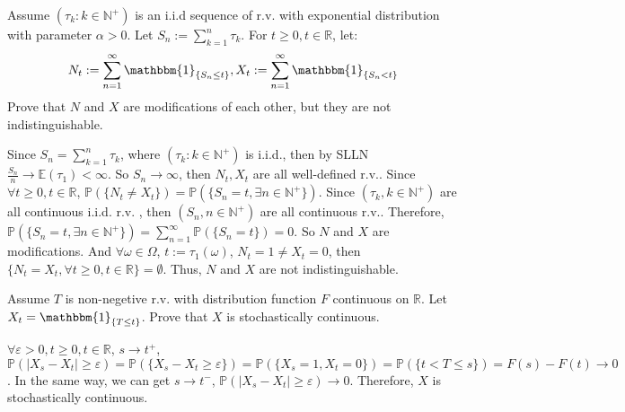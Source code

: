 \documentclass{ctexart}
\begin{document}
\begin{problem}\label{pro:4}
  Assume \((\tau_k:k \in \mathbb{N}^+)\) is an i.i.d sequence of r.v. with exponential distribution with parameter \(\alpha>0\).
  Let \(S_n:=\sum_{k=1}^{n}\tau_k\). For \(t \geq 0,t \in \mathbb{R}\), let:
  \[
    N_t:=\sum_{n=1}^{\infty}\mathbbm{1}_{\{S_n \leq t\}},
    X_t:=\sum_{n=1}^{\infty}\mathbbm{1}_{\{S_n < t\}}
  \]
  Prove that \(N\) and \(X\) are modifications of each other, but they are not indistinguishable.
\end{problem}
\begin{solution}
  Since \(S_n = \sum_{k = 1}^n \tau_k\), where \((\tau_k: k \in \mathbb{N}^+)\) is i.i.d.,
  then by SLLN \(\frac{S_n}{n} \to \mathbb{E}(\tau_1) < \infty\).
  So \(S_n \to \infty\), then \(N_t, X_t\) are all well-defined r.v..
  Since \(\forall t \geq 0, t \in \mathbb{R}\), \(\mathbb{P}(\{N_t \neq X_t\}) = \mathbb{P}(\{S_n = t, \exists n \in \mathbb{N}^+\})\).
  Since \((\tau_k, k \in \mathbb{N}^+)\) are all continuous i.i.d. r.v. , then
  \((S_n, n \in \mathbb{N}^+)\) are all continuous r.v..
  Therefore, \(\mathbb{P}(\{S_n=t, \exists n \in \mathbb{N}^+\}) = \sum_{n = 1}^{\infty} \mathbb{P}(\{S_n = t\})=0\).
  So \(N\) and \(X\) are modifications.
  And \(\forall \omega \in \Omega\), \(t:= \tau_1(\omega)\), \(N_t = 1 \neq X_t = 0\),
  then \(\{N_t = X_t, \forall t \geq 0, t \in \mathbb{R}\} = \emptyset\).
  Thus, \(N\) and \(X\) are not indistinguishable.
\end{solution}

\begin{problem}\label{pro:5}
  Assume \(T\) is non-negetive r.v. with distribution function \(F\) continuous on \(\mathbb{R}\).
  Let \(X_t=\mathbbm{1}_{\{T \leq t\}}\).
  Prove that \(X\) is stochastically continuous.
\end{problem}
\begin{solution}
  \(\forall \varepsilon > 0, t \geq 0, t \in \mathbb{R}\), \(s \to t^+\), \(\mathbb{P}(|X_s-X_t| \geq \varepsilon)= \mathbb{P}(\{X_s-X_t \geq \varepsilon\})= \mathbb{P}(\{X_s = 1, X_t =0\}) = \mathbb{P}(\{t < T \leq s\})= F(s)-F(t) \to 0\).
  In the same way, we can get \(s \to t^-\), \(\mathbb{P}(|X_s-X_t| \geq \varepsilon) \to 0\).
  Therefore, \(X\) is stochastically continuous.
\end{solution}
\end{document}
